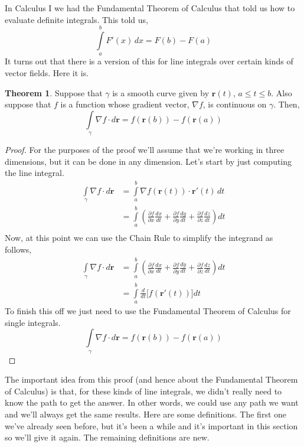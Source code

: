 \documentclass[10pt,reqno]{book}
\theoremstyle{definition}
\newtheorem{theorem}{Theorem}[section]
\renewcommand{\vec}[1]{\mathbf{#1}}
\begin{document}
	In Calculus I we had the Fundamental Theorem of Calculus that told us how to evaluate definite integrals. This told us,
	\[ \int\limits_a^b F'(x)\,dx = F(b) - F(a) \]
	It turns out that there is a version of this for line integrals over certain kinds of vector fields.  Here it is.
	\begin{theorem}
		Suppose that $ \gamma $ is a smooth curve given by $ \vec{r}(t)$, $ a \leq t \leq b $. Also suppose that $ f $ is a function whose gradient vector, $ \nabla f $, is continuous on $ \gamma $. Then,
		\[ \int\limits_{\gamma} \nabla f \cdot d\vec{r} = f(\vec{r}(b)) - f(\vec{r}(a)) \]
	\end{theorem}
	\begin{proof}
		For the purposes of the proof we'll assume that we're working in three dimensions, but it can be done in any dimension. Let's start by just computing the line integral.
		\begin{align*}
			\int\limits_{\gamma} \nabla f \cdot d\vec{r} &= \int\limits_a^b \nabla f(\vec{r}(t)) \cdot \vec{r}'(t)\,dt\\
			&= \int\limits_a^b \left( \frac{\partial f}{\partial x} \frac{dx}{dt} + \frac{\partial f}{\partial y} \frac{dy}{dt} + \frac{\partial f}{\partial z} \frac{dz}{dt} \right) dt \\
		\end{align*}
		Now, at this point we can use the Chain Rule to simplify the integrand as follows,
		\begin{align*}
			\int\limits_{\gamma} \nabla f \cdot d\vec{r} &= \int\limits_a^b \left( \frac{\partial f}{\partial x} \frac{dx}{dt} + \frac{\partial f}{\partial y} \frac{dy}{dt} + \frac{\partial f}{\partial z} \frac{dz}{dt} \right) dt \\
			&= \int\limits_a^b \frac{d}{dt} \big[ f(\vec{r}'(t)) \big] dt
		\end{align*}
		To finish this off we just need to use the Fundamental Theorem of Calculus for single integrals.
		\[ \int\limits_{\gamma} \nabla f \cdot d\vec{r} = f(\vec{r}(b)) - f(\vec{r}(a)) \]
	\end{proof}
	\noindent The important idea from this proof (and hence about the Fundamental Theorem of Calculus) is that, for these kinds of line integrals, we didn't really need to know the path to get the answer. In other words, we could use any path we want and we’ll always get the same results. Here are some definitions. The first one we've already seen before, but it's been a while and it's important in this section so we'll give it again. The remaining definitions are new.\\ \\
\end{document}
